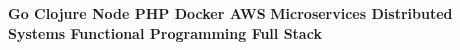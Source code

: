 

\begin{cvskills}

  \cvskill
    {} {\textbf{ Go \hspace{45pt}  Clojure \hspace{45pt} Node \hspace{45pt} PHP \hspace{45pt} Docker \hspace{45pt} AWS}}
   \cvskill
    {} {\textbf{ \hspace{15pt} Microservices \hspace{25pt} Distributed Systems \hspace{25pt}  Functional Programming  
        \hspace{25pt}Full Stack}}  

 

\end{cvskills}
